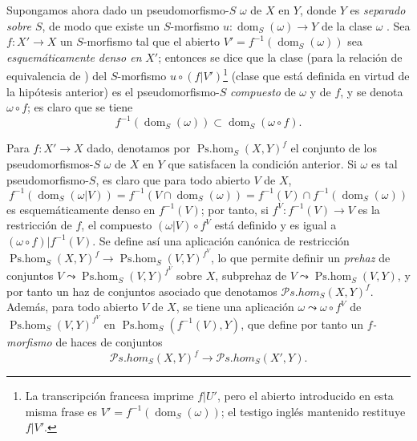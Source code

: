 \begin{env}[20.3.2]
\label{IV.20.3.2}
Supongamos ahora dado un pseudomorfismo-$S$ $\omega$ de $X$ en $Y$, donde $Y$ es \emph{separado sobre $S$}, de modo que existe un $S$-morfismo $u:\operatorname{dom}_S(\omega)\to Y$ de la clase $\omega$ .
Sea $f:X'\to X$ un $S$-morfismo tal que el abierto $V'=f^{-1}(\operatorname{dom}_S(\omega))$ sea \emph{esquemáticamente denso en} $X'$; entonces se dice que la clase (para la relación de equivalencia de ) del $S$-morfismo $u\circ(f|V')$\footnote{La transcripción francesa imprime $f|U'$, pero el abierto introducido en esta misma frase es $V'=f^{-1}(\operatorname{dom}_S(\omega))$; el testigo inglés mantenido restituye $f|V'$.} (clase que está definida en virtud de la hipótesis anterior) es el pseudomorfismo-$S$ \emph{compuesto} de $\omega$ y de $f$, y se denota $\omega\circ f$; es claro que se tiene
\[
\label{IV.20.3.2.1}
  f^{-1}(\operatorname{dom}_S(\omega))\subset\operatorname{dom}_S(\omega\circ f).
  \tag{20.3.2.1}
\]

Para $f:X'\to X$ dado, denotamos por $\operatorname{Ps.hom}_S(X,Y)^f$ el conjunto de los pseudomorfismos-$S$ $\omega$ de $X$ en $Y$ que satisfacen la condición anterior.
Si $\omega$ es tal pseudomorfismo-$S$, es claro que para todo abierto $V$ de $X$,
\[
  f^{-1}(\operatorname{dom}_S(\omega|V))=f^{-1}(V\cap\operatorname{dom}_S(\omega))=f^{-1}(V)\cap f^{-1}(\operatorname{dom}_S(\omega))
\]
es esquemáticamente denso en $f^{-1}(V)$; por tanto, si $f^V:f^{-1}(V)\to V$ es la restricción de $f$, el compuesto $(\omega|V)\circ f^V$ está definido y es igual a $(\omega\circ f)|f^{-1}(V)$.
Se define así una
aplicación canónica de restricción $\operatorname{Ps.hom}_S(X,Y)^f\to\operatorname{Ps.hom}_S(V,Y)^{f^V}$, lo que permite definir un \emph{prehaz} de conjuntos $V\leadsto\operatorname{Ps.hom}_S(V,Y)^{f^V}$ sobre $X$, subprehaz de $V\leadsto\operatorname{Ps.hom}_S(V,Y)$, y por tanto un haz de conjuntos asociado que denotamos $\mathscr{P}\!s.\!\mathit{hom}_S(X,Y)^f$.
Además, para todo abierto $V$ de $X$, se tiene una aplicación $\omega\leadsto\omega\circ f^V$ de $\operatorname{Ps.hom}_S(V,Y)^{f^V}$ en $\operatorname{Ps.hom}_S(f^{-1}(V),Y)$, que define por tanto un \emph{$f$-morfismo} de haces de conjuntos
\[
  \mathscr{P}\!s.\!\mathit{hom}_S(X,Y)^f\to\mathscr{P}\!s.\!\mathit{hom}_S(X',Y).
\]
\end{env}

